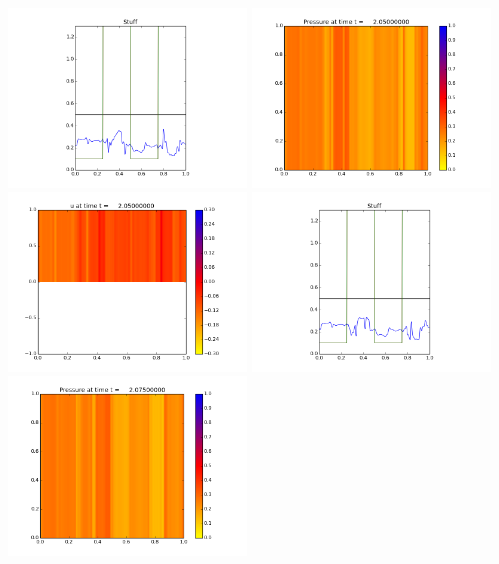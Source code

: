 \documentclass[11pt]{article}
\begin{document}
\vskip 10pt 
\includegraphics[width=0.475\textwidth]{frame0081fig3.png}
\vskip 10pt 
\includegraphics[width=0.475\textwidth]{frame0082fig0.png}
\includegraphics[width=0.475\textwidth]{frame0082fig1.png}
\vskip 10pt 
\includegraphics[width=0.475\textwidth]{frame0082fig3.png}
\vskip 10pt 
\includegraphics[width=0.475\textwidth]{frame0083fig0.png}
\end{document}
